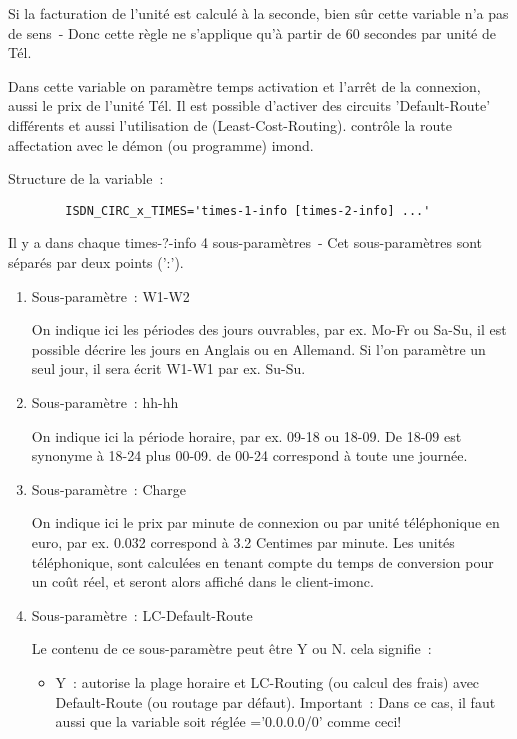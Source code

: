 \begin{description}
  Si la facturation de l'unité est calculé à la seconde, bien sûr cette variable n'a pas
  de sens~- Donc cette règle ne s'applique qu'à partir de 60 secondes par unité de Tél.


  Dans cette variable on paramètre temps activation et l'arrêt de la connexion,
  aussi le prix de l'unité Tél. Il est possible d'activer des circuits 'Default-Route'
  différents et aussi l'utilisation de (Least-Cost-Routing). contrôle la route
  affectation avec le démon (ou programme) imond.

  Structure de la variable~:

\begin{example}
\begin{verbatim}
        ISDN_CIRC_x_TIMES='times-1-info [times-2-info] ...'
\end{verbatim}
\end{example}


  Il y a dans chaque times-?-info 4 sous-paramètres~- Cet sous-paramètres sont séparés
  par deux points (':').
  \begin{enumerate}
  \item Sous-paramètre~: W1-W2

    On indique ici les périodes des jours ouvrables, par ex. Mo-Fr ou Sa-Su, il est
    possible décrire les jours en Anglais ou en Allemand. Si l'on paramètre un seul
    jour, il sera écrit W1-W1 par ex. Su-Su.

  \item Sous-paramètre~: hh-hh

    On indique ici la période horaire, par ex. 09-18 ou 18-09. De 18-09 est synonyme
    à 18-24 plus 00-09. de 00-24 correspond à toute une journée.

  \item  Sous-paramètre~: Charge

    On indique ici le prix par minute de connexion ou par unité téléphonique en euro,
    par ex. 0.032 correspond à 3.2 Centimes par minute. Les unités téléphonique, sont
    calculées en tenant compte du temps de conversion pour un coût réel, et seront
    alors affiché dans le client-imonc.

  \item  Sous-paramètre~: LC-Default-Route

    Le contenu de ce sous-paramètre peut être Y ou N. cela signifie~:

    \begin{itemize}
    \item Y~: autorise la plage horaire et LC-Routing (ou calcul des frais)
      avec Default-Route (ou routage par défaut). Important~: Dans ce cas,
      il faut aussi que la variable soit réglée ='0.0.0.0/0'
      comme ceci!


\end{itemize}
\end{enumerate}
\end{description}
